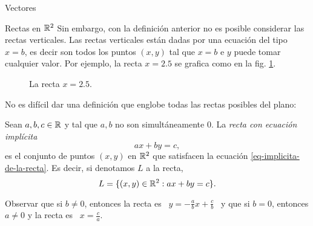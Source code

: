 \begin{chapter}{Vectores}
\begin{section}{Rectas en $\mathbb R^2$}
    Sin embargo, con la definición anterior no es posible considerar las rectas verticales. Las rectas verticales están dadas por una ecuación del tipo $x= b$,  es decir son todos los puntos $(x,y)$  tal que $x=b$ e $y$ puede tomar cualquier valor. Por ejemplo, la recta $x=2.5$ se  grafica  como en la fig. \ref{fig-recta-vertical}.
    \begin{figure}[h]
    	\centering
        \caption{La recta $x=2.5$.}
        \label{fig-recta-vertical}
    \end{figure} 
    
    No es difícil dar una definición que englobe todas las rectas posibles del plano:
    
    \begin{definicion} Sean  $a,b,c \in \mathbb R$ y tal que $a,b$ no son simultáneamente $0$. La \textit{recta con ecuación implícita} 
    \begin{equation}\label{eq-implicita-de-la-recta}
        ax +by =c,
    \end{equation}
    es el conjunto de puntos $(x,y)$ en $\mathbb R^2$ que satisfacen la ecuación \eqref{eq-implicita-de-la-recta}.  Es decir, si denotamos $L$  a la recta,
    \begin{equation*}
        L = \{ (x,y)\in \mathbb R^2: ax +by =c\}.
    \end{equation*}
    \end{definicion}


    Observar  que si $b\ne0$, entonces la recta es \, $y= -\displaystyle\frac{a}{b}x + \displaystyle\frac{c}{b}$ \, y que si $b=0$,  entonces $a\ne 0$ y la recta es \, $x =\displaystyle\frac{c}{a}$.
    

\end{section}
\end{chapter}
